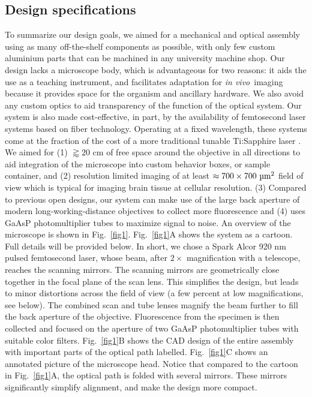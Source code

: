 \documentclass[10pt,letterpaper]{article}
\newcommand{\invivo}{\textit{in vivo}~}
\begin{document}
\subsection*{Design specifications}
To summarize our design goals, we aimed for a mechanical and optical assembly using as many off-the-shelf components as possible, with only few custom aluminium parts that can be machined in any university machine shop. Our design lacks a microscope body, which is  advantageous for two reasons: it aids the use as a teaching instrument, and facilitates adaptation for \invivo imaging because it provides space for the organism and ancillary hardware. We also avoid any custom optics to aid transparency of the function of the optical system. Our system is also made cost-effective, in part, by the availability of femtosecond laser systems based on fiber technology. Operating at a fixed wavelength, these systems come at the fraction of the cost of a more traditional tunable Ti:Sapphire laser \cite{Bueno2019}.\newline
We aimed for (1) $\gtrapprox20\text{ cm}$ of free space around the objective in all directions to aid integration of the microscope into custom behavior boxes, or sample container, and (2) resolution limited imaging of at least $\approx 700\times 700\text{ \textmu m}^2$ field of view which is typical for imaging brain tissue at cellular resolution. (3) Compared to previous open designs\cite{Rosenegger2014, Mayrhofer2015}, our system can make use of the large back aperture of modern long-working-distance objectives to collect more fluorescence and (4) uses GaAsP photomultiplier tubes to maximize signal to noise.\newline
An overview of the microscope is shown in Fig.~\ref{fig1}. Fig.~\ref{fig1}A shows the system as a cartoon. Full details will be provided below. In short, we chose a Spark Alcor 920 nm pulsed femtosecond laser, whose beam, after $2\times$ magnification with a telescope, reaches the scanning mirrors. The scanning mirrors are geometrically close together in the focal plane of the scan lens. This simplifies the design, but leads to minor distortions across the field of view (a few percent at low magnifications, see below). The combined scan and tube lenses magnify the beam further to fill the back aperture of the objective. Fluorescence from the specimen is then collected and focused on the aperture of two GaAsP photomultiplier tubes with suitable color filters. Fig.~\ref{fig1}B shows the CAD design of the entire assembly with important parts of the optical path labelled. Fig.~\ref{fig1}C shows an annotated picture of the microscope head. Notice that compared to the cartoon in Fig.~\ref{fig1}A, the optical path is folded with several mirrors. These mirrors significantly simplify alignment, and make the design more compact.
\end{document}
